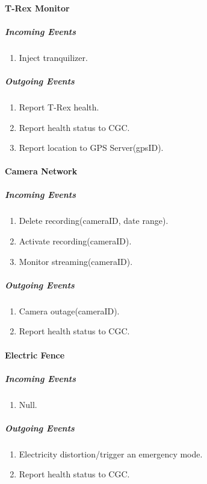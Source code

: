 \documentclass[12pt]{article}
\begin{document}
    \paragraph{T-Rex Monitor}
	\textit{}
	    \subparagraph{Incoming Events}
		\begin{enumerate}
			\item Inject tranquilizer. 
		\end{enumerate}
				
	    \subparagraph{Outgoing Events}
		\begin{enumerate}
			\item Report T-Rex health.
			\item Report health status to CGC.
			\item Report location to GPS Server(gpsID).
		\end{enumerate}

	\paragraph{Camera Network}
	\textit{}
	    \subparagraph{Incoming Events}
		\begin{enumerate}
			\item Delete recording(cameraID, date range).
			\item Activate recording(cameraID).
			\item Monitor streaming(cameraID).
		\end{enumerate}
		
	    \subparagraph{Outgoing Events}
		\begin{enumerate}
			\item Camera outage(cameraID).
			\item Report health status to CGC. 
		\end{enumerate}

	\paragraph{Electric Fence}
	\textit{}
	    \subparagraph{Incoming Events}
		\begin{enumerate}
			\item Null.
		\end{enumerate}
				
	    \subparagraph{Outgoing Events}
		\begin{enumerate}
		    \item Electricity distortion/trigger an emergency mode.
		    \item Report health status to CGC. 
		\end{enumerate}
\end{document}
